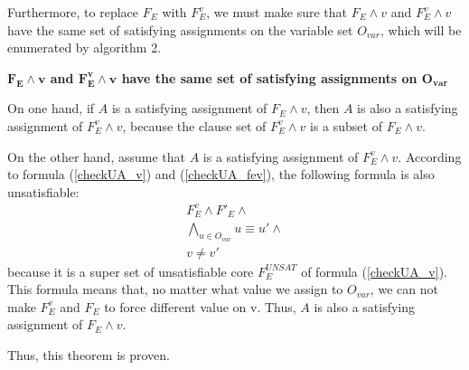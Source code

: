 \documentclass[journal]{IEEEtran}
\begin{document}
Furthermore,
to replace $F_E$ with $F_E^v$,
we must make sure that $F_E\wedge v$ and $F_E^v\wedge v$ have the same set of satisfying assignments on the variable set $O_{var}$,
which will be enumerated by algorithm 2.
\begin{theorem}[]\label{thm_fe_fev_eq}
\textbf{$\boldsymbol{F_E\wedge v}$ and $\boldsymbol{F_E^v\wedge v}$ have the same set of satisfying assignments on $\boldsymbol{O_{var}}$}
\end{theorem}
\begin{IEEEproof}
On one hand,
if $A$ is a satisfying assignment of $F_E\wedge v$,
then $A$ is also a satisfying assignment of $F_E^v\wedge v$,
because the clause set of $F_E^v\wedge v$ is a subset of $F_E\wedge v$.

On the other hand,
assume that $A$ is a satisfying assignment of $F_E^v\wedge v$.
According to formula (\ref{checkUA_v}) and (\ref{checkUA_fev}),
the following formula is also unsatisfiable:
\begin{displaymath}
\begin{array}{c}
F_E^v\wedge F'_E\wedge \\
\bigwedge_{u\in O_{var}} u\equiv u'\wedge \\
v\ne v'
\end{array}
\end{displaymath}
because it is a super set of unsatisfiable core $F_E^{UNSAT}$ of formula (\ref{checkUA_v}).
This formula means that,
no matter what value we assign to $O_{var}$,
we can not make $F_E^v$ and $F_E$ to force different value on v.
Thus,
$A$ is also a satisfying assignment of $F_E\wedge v$.

Thus, this theorem is proven.
\end{IEEEproof}
\end{document}
